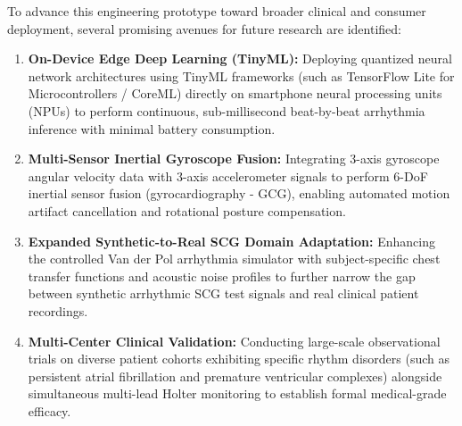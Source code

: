 To advance this engineering prototype toward broader clinical and consumer deployment, several promising avenues for future research are identified:
\begin{enumerate}
    \item \textbf{On-Device Edge Deep Learning (TinyML):} Deploying quantized neural network architectures using TinyML frameworks \cite{warden2019tinyml} (such as TensorFlow Lite for Microcontrollers / CoreML) directly on smartphone neural processing units (NPUs) to perform continuous, sub-millisecond beat-by-beat arrhythmia inference with minimal battery consumption.
    \item \textbf{Multi-Sensor Inertial Gyroscope Fusion:} Integrating 3-axis gyroscope angular velocity data with 3-axis accelerometer signals to perform 6-DoF inertial sensor fusion (gyrocardiography - GCG), enabling automated motion artifact cancellation and rotational posture compensation.
    \item \textbf{Expanded Synthetic-to-Real SCG Domain Adaptation:} Enhancing the controlled Van der Pol arrhythmia simulator with subject-specific chest transfer functions and acoustic noise profiles to further narrow the gap between synthetic arrhythmic SCG test signals and real clinical patient recordings.
    \item \textbf{Multi-Center Clinical Validation:} Conducting large-scale observational trials on diverse patient cohorts exhibiting specific rhythm disorders (such as persistent atrial fibrillation and premature ventricular complexes) alongside simultaneous multi-lead Holter monitoring to establish formal medical-grade efficacy.
\end{enumerate}
